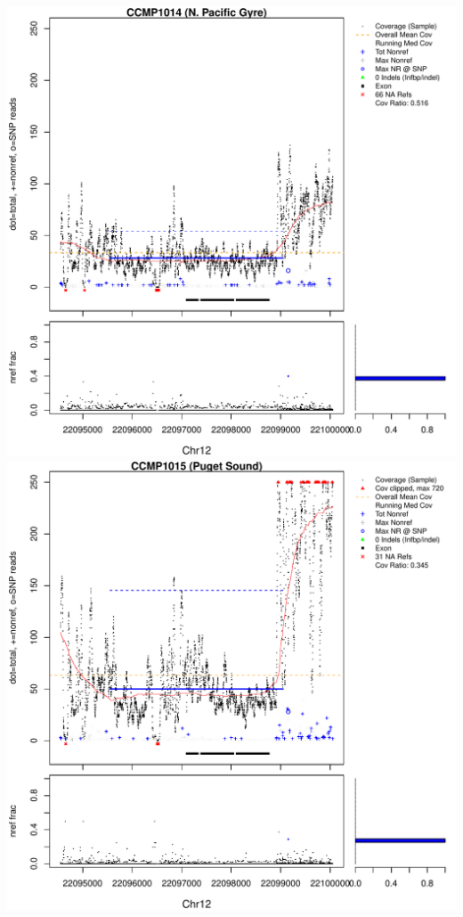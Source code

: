 \documentclass{article}\usepackage[]{graphicx}\usepackage[]{color}
\makeatletter
\def\maxwidth{ %
  \ifdim\Gin@nat@width>\linewidth
    \linewidth
  \else
    \Gin@nat@width
  \fi
}
\newenvironment{knitrout}{}{} %
\makeatother
\begin{document}
\begin{knitrout}
{\includegraphics[width=\maxwidth]{figs-knitr/unnamed-chunk-55-5} 
\includegraphics[width=\maxwidth]{figs-knitr/unnamed-chunk-55-6} 
}
\end{knitrout}
\end{document}
